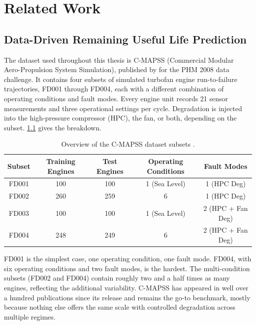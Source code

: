 \cleardoublepage

\chapter{Related Work}
\label{Chapter:Related_work}

\section{Data-Driven Remaining Useful Life Prediction}
The dataset used throughout this thesis is C-MAPSS (Commercial Modular Aero-Propulsion System Simulation), published by \cite{Saxena2008} for the PHM 2008 data challenge. It contains four subsets of simulated turbofan engine run-to-failure trajectories, FD001 through FD004, each with a different combination of operating conditions and fault modes. Every engine unit records 21 sensor measurements and three operational settings per cycle. Degradation is injected into the high-pressure compressor (HPC), the fan, or both, depending on the subset. \ref{tab:CMAPSS} gives the breakdown.

\begin{table}[ht]
    \centering
    \begin{tabular}{c c c c c}
        \toprule
        Subset & Training Engines & Test Engines & Operating Conditions & Fault Modes \\
        \midrule
        FD001 & 100 & 100 & 1 (Sea Level) & 1 (HPC Deg) \\
        FD002 & 260 & 259 & 6              & 1 (HPC Deg) \\
        FD003 & 100 & 100 & 1 (Sea Level) & 2 (HPC + Fan Deg) \\
        FD004 & 248 & 249 & 6              & 2 (HPC + Fan Deg) \\
        \bottomrule
    \end{tabular}
    \caption{Overview of the C-MAPSS dataset subsets \cite{Saxena2008}.}
    \label{tab:CMAPSS}
\end{table}

FD001 is the simplest case, one operating condition, one fault mode. FD004, with six operating conditions and two fault modes, is the hardest. The multi-condition subsets (FD002 and FD004) contain roughly two and a half times as many engines, reflecting the additional variability. C-MAPSS has appeared in well over a hundred publications since its release and remains the go-to benchmark, mostly because nothing else offers the same scale with controlled degradation across multiple regimes.

